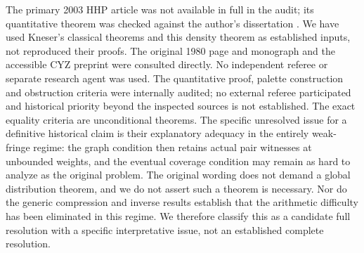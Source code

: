 \documentclass[11pt]{article}
\theoremstyle{remark}\newtheorem{remark}[theorem]{Remark}
\begin{document}
The primary 2003 HHP article was not available in full in the audit; its quantitative theorem was checked against the author's dissertation \cite[Theorem 4.8]{Heg}. We have used Kneser's classical theorems and this density theorem as established inputs, not reproduced their proofs. The original 1980 page and monograph and the accessible CYZ preprint were consulted directly. No independent referee or separate research agent was used. The quantitative proof, palette construction and obstruction criteria were internally audited; no external referee participated and historical priority beyond the inspected sources is not established. The exact equality criteria are unconditional theorems. The specific unresolved issue for a definitive historical claim is their explanatory adequacy in the entirely weak-fringe regime: the graph condition then retains actual pair witnesses at unbounded weights, and the eventual coverage condition may remain as hard to analyze as the original problem. The original wording does not demand a global distribution theorem, and we do not assert such a theorem is necessary. Nor do the generic compression and inverse results establish that the arithmetic difficulty has been eliminated in this regime. We therefore classify this as a candidate full resolution with a specific interpretative issue, not an established complete resolution.
\end{document}
